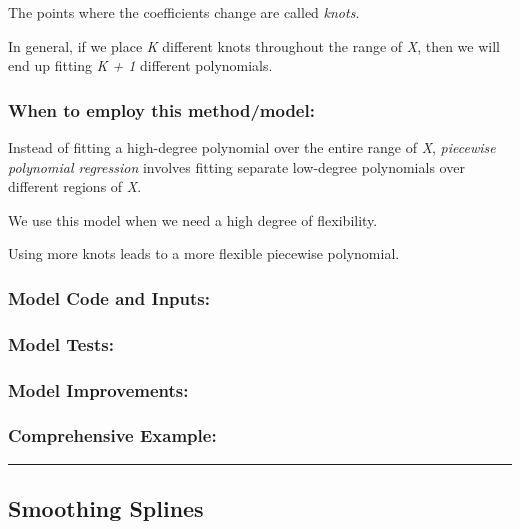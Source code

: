 \documentclass[
]{article}
\begin{document}
The points where the coefficients change are called \emph{knots}.

In general, if we place \emph{K} different knots throughout the range of
\emph{X}, then we will end up fitting \emph{K + 1} different
polynomials.

\hypertarget{when-to-employ-this-methodmodel-6}{%
\subsubsection{When to employ this
method/model:}\label{when-to-employ-this-methodmodel-6}}

Instead of fitting a high-degree polynomial over the entire range of
\emph{X}, \emph{piecewise polynomial regression} involves fitting
separate low-degree polynomials over different regions of \emph{X}.

We use this model when we need a high degree of flexibility.

Using more knots leads to a more flexible piecewise polynomial.

\hypertarget{model-code-and-inputs-6}{%
\subsubsection{Model Code and Inputs:}\label{model-code-and-inputs-6}}

\hypertarget{model-tests-6}{%
\subsubsection{Model Tests:}\label{model-tests-6}}

\hypertarget{model-improvements-6}{%
\subsubsection{Model Improvements:}\label{model-improvements-6}}

\hypertarget{comprehensive-example-6}{%
\subsubsection{Comprehensive Example:}\label{comprehensive-example-6}}

\begin{center}\rule{0.5\linewidth}{0.5pt}\end{center}

\hypertarget{smoothing-splines}{%
\subsection{Smoothing Splines}\label{smoothing-splines}}
\end{document}
